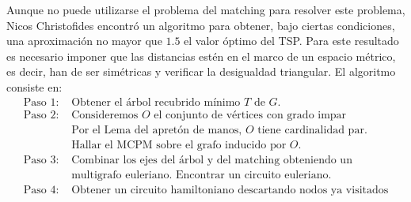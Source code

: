\documentclass[twoside,a4paper,openright,12pt,tikz]{book}
\begin{document}
Aunque no puede utilizarse el problema del matching para resolver este problema, Nicos Christofides encontró un algoritmo \cite{nico} para obtener, bajo ciertas condiciones, una aproximación no mayor que $1.5$ el valor óptimo del TSP. Para este resultado es necesario imponer que las distancias estén en el marco de un espacio métrico, es decir, han de ser simétricas y verificar la desigualdad triangular. El algoritmo consiste en:
\begin{align*}
\text{Paso 1: }&\text{Obtener el árbol recubrido mínimo $T$ de $G$.}\\
\text{Paso 2: }&\text{Consideremos $O$ el conjunto de vértices con grado impar}\\
&\text{Por el Lema del apretón de manos, $O$ tiene cardinalidad par.}\\
&\text{Hallar el MCPM sobre el grafo inducido por $O$.}\\
\text{Paso 3: }& \text{Combinar los ejes del árbol y del matching obteniendo un}\\
&\text{multigrafo euleriano. Encontrar un circuito euleriano.}\\
\text{Paso 4: }&\text{Obtener un circuito hamiltoniano descartando nodos ya visitados}
\end{align*} 
\end{document}
